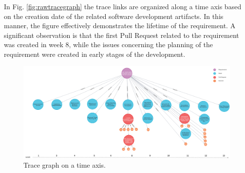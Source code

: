 In Fig. \ref{fig:rawtracegraph} the trace links are organized along a time axis based on the creation date of the related software development artifacts. In this manner, the figure effectively demonstrates the lifetime of the requirement. A significant observation is that the first Pull Request related to the requirement was created in week 8, while the issues concerning the planning of the requirement were created in early stages of the development.


\begin{figure}[htb]
    \centering
    \includegraphics[width=0.85\linewidth]{figs/traceGraph.png}
    \caption{Trace graph on a time axis.}
    \label{fig:tracegraph}
\end{figure}










